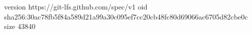 version https://git-lfs.github.com/spec/v1
oid sha256:30ac78fb5f84a589d21a99a30c095ef7cc20cb48fc80d69066ac6705d82cbe0c
size 43840
